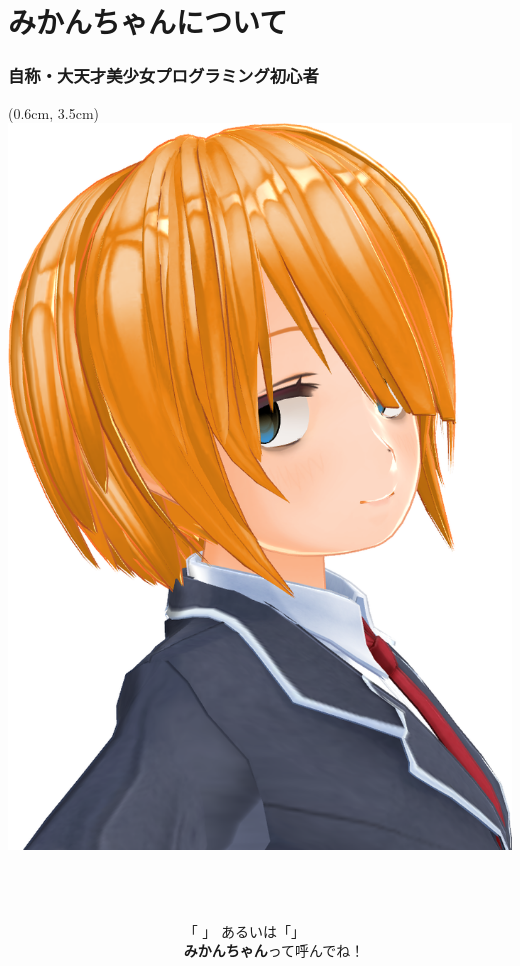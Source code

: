 \documentclass[
  lualatex,
  aspectratio=169,
  14pt
]{beamer}
\begin{document}
\section*{みかんちゃんについて}

\begin{frame}
  \frametitle{自称・大天才美少女プログラミング初心者}

  \begin{textblock*}{0.5\paperwidth}(0.6cm, 3.5cm)
    \includegraphics[width=0.3\paperwidth]{./images/mikanchan.png}
  \end{textblock*}
  \begin{columns}
    \begin{column}{0.30\textwidth}
      \\~\\[-.25\baselineskip]
    \end{column}
    \begin{column}{0.69\textwidth}
      \\~\\[-.25\baselineskip]
      「 」
      あるいは「」\\
      \hspace{1.5\zw}\textbf{みかんちゃん}って呼んでね！
      \\~\\[-.5\baselineskip]


\end{column}
\end{columns}
\end{frame}
\end{document}
